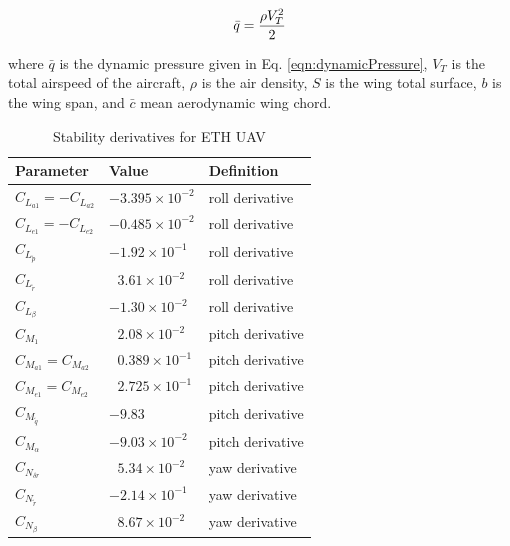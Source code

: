 \begin{equation}{\label{eqn:dynamicPressure}}
\bar{q} = \frac{\rho V_T^2}{2} 
\end{equation}

where $\bar{q}$ is the dynamic pressure given in  Eq. \ref{eqn:dynamicPressure}, $V_T$ is the total airspeed of the aircraft, $\rho$ is the air density, $S$ is the wing total surface, $b$ is the wing span, and $\bar{c}$ mean aerodynamic wing chord. 

\begin{table}
\label{arm:momentsETHcraft}
\caption{Stability derivatives for ETH UAV \cite{ducard2009fault}}
\label{arm:ethcraft}
\begin{center}
\begin{tabular}{ ||p{3cm}|p{3cm}|p{3cm}||}\hline
\textbf{Parameter} & \textbf{Value} & \textbf{Definition} \\\hline
$C_{L_{a1}} = - C_{L_{a2}}$ & $-3.395 \times 10^{-2}$	   & roll derivative \\\hline
$C_{L_{e1}} = - C_{L_{e2}}$ & $-0.485 \times 10^{-2}$         & roll derivative \\\hline
$C_{L_{\tilde{p}}}$                 & $-1.92 \times 10^{-1}$	   & roll derivative \\\hline
$C_{L_{\tilde{r}}} $                 & $\ \ \, 3.61 \times 10^{-2}$     & roll derivative \\\hline
$C_{L_\beta}$                        & $-1.30 \times 10^{-2}$	   & roll derivative \\\hline
$ C_{M_{1}}$                          & $\ \ \, 2.08 \times 10^{-2}$	   & pitch derivative \\\hline
$C_{M_{a1}} = C_{M_{a2}} $ & $\ \ \, 0.389 \times 10^{-1}$  & pitch derivative \\\hline
$C_{M_{e1}} = C_{M_{e2}} $ & $\ \ \, 2.725 \times 10^{-1}$  &  pitch derivative \\\hline
$C_{M_{\tilde{q}}} $               & $-9.83$	                            & pitch derivative \\\hline
$C_{M_\alpha} $                    & $-9.03 \times 10^{-2}$ 	   & pitch derivative \\\hline
$C_{N_{\delta r}}$                  & $\ \ \, 5.34 \times 10^{-2}$ 	   & yaw derivative \\\hline
$ C_{N_{\tilde{r}}}$                 & $-2.14 \times 10^{-1}$	   & yaw derivative \\\hline
$C_{N_\beta} $                       & $\ \ \, 8.67 \times 10^{-2}$	     & yaw derivative \\\hline
\end{tabular}
\end{center}
\end{table}

